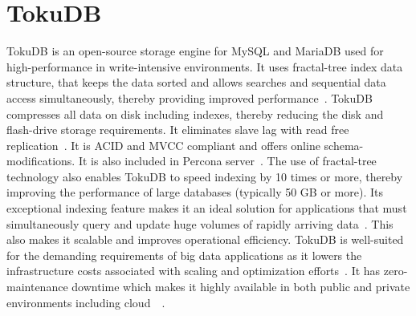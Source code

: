 \section{TokuDB}

TokuDB is an open-source storage engine for MySQL and MariaDB used for
high-performance in write-intensive environments. It
uses fractal-tree index data structure, that keeps the data
sorted and allows searches and sequential data access simultaneously, thereby
providing improved performance~\cite{hid-sp18-516-www-wiki-tokudb}. TokuDB
compresses all data on disk including indexes, thereby reducing the disk and
flash-drive storage requirements. It eliminates slave lag with read free
replication~\cite{hid-sp18-516-www-percona-server-tokudb}. It is ACID and MVCC
compliant and offers online schema-modifications. It is also included in
Percona server~\cite{hid-sp18-516-www-wiki-tokudb}. The use of
fractal-tree technology also enables TokuDB to speed indexing by 10 times or
more, thereby improving the performance of large databases (typically 50 GB or
more). Its exceptional indexing feature makes it an ideal solution for
applications that must simultaneously query and update huge volumes of rapidly
arriving data~\cite{hid-sp18-516-www-blackbird-si}. This also makes it scalable
and improves operational efficiency. TokuDB is well-suited for the demanding
requirements of big data applications as it lowers the infrastructure costs
associated with scaling and optimization
efforts~\cite{hid-sp18-516-www-percona-tokudb}. It has zero-maintenance downtime
which makes it highly available in both public and private environments
including
cloud~\cite{hid-sp18-516-www-percona-server-tokudb}~\cite{hid-sp18-516-www-percona-tokudb}.

